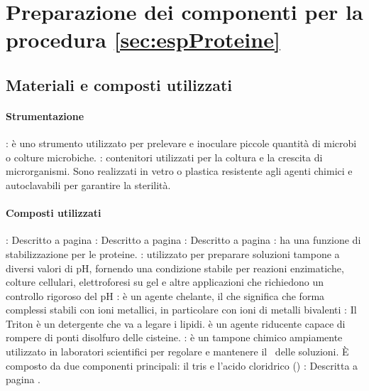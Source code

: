 \section{Preparazione dei componenti per la procedura \ref*{sec:espProteine}}

\subsection{Materiali e composti utilizzati}
\begingroup
{}
\paragraph{Strumentazione}
\begin{itemize}
	\itemb[Ansa]: è uno strumento utilizzato per prelevare e inoculare piccole quantità di microbi o colture microbiche.
	: contenitori utilizzati per la coltura e la crescita di microrganismi. Sono realizzati in vetro o plastica resistente agli agenti chimici e autoclavabili per garantire la sterilità.
\end{itemize}

\paragraph{Composti utilizzati}
\begin{itemize}\label{it:compostiUtilizzatiRel8}
	: Descritto a pagina \pageref{it:prepLBsolido-CompostiUtilizzati}
	: Descritto a pagina \pageref{it:prepLBsolido-CompostiUtilizzati}
	: Descritto a pagina \pageref{it:prepLBsolido-CompostiUtilizzati}
	\itemb[Saccarosio]: ha una funzione di stabilizzazione per le proteine.
	: utilizzato per preparare soluzioni tampone a diversi valori di pH, fornendo una condizione stabile per reazioni enzimatiche, colture cellulari, elettroforesi su gel e altre applicazioni che richiedono un controllo rigoroso del pH
	: è un agente chelante, il che significa che forma complessi stabili con ioni metallici, in particolare con ioni di metalli bivalenti
	\itemb[Triton X-100]: Il Triton è un detergente che va a legare i lipidi.
	 è un agente riducente capace di rompere di ponti disolfuro delle cisteine.
	: è un tampone chimico ampiamente utilizzato in laboratori scientifici per regolare e mantenere il \pH\ delle soluzioni. È composto da due componenti principali: il \gls{tris} e l'acido cloridrico ()
	\itemb[Ampicillina]: Descritta a pagina \pageref{it:prepLBsolido-CompostiUtilizzati}.
\end{itemize}

